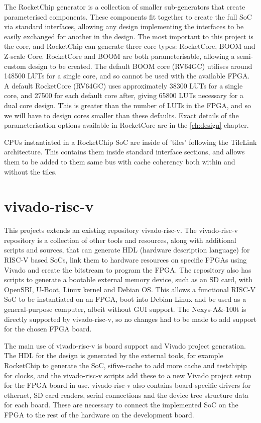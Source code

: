 The RocketChip generator is a collection of smaller sub-generators that create parameterised components. These components fit together to create the full SoC via standard interfaces, allowing any design implementing the interfaces to be easily exchanged for another in the design. The most important to this project is the core, and RocketChip can generate three core types: RocketCore, BOOM and Z-scale Core. RocketCore and BOOM are both parameterisable, allowing a semi-custom design to be created. The default BOOM core (RV64GC) utilises around 148500 LUTs for a single core, and so cannot be used with the available FPGA. A default RocketCore (RV64GC) uses approximately 38300 LUTs for a single core, and 27500 for each default core after, giving 65800 LUTs necessary for a dual core design. This is greater than the number of LUTs in the FPGA, and so we will have to design cores smaller than these defaults. Exact details of the parameterisation options available in RocketCore are in the \ref{ch:design} chapter.

CPUs instantiated in a RocketChip SoC are inside of 'tiles' following the TileLink architecture. This contains them inside standard interface sections, and allows them to be added to them same bus with cache coherency both within and without the tiles.

\section{vivado-risc-v}
\label{vivado-risc-v}
This projects extends an existing repository vivado-risc-v\cite{vivado-risc-v}. The vivado-risc-v repository is a collection of other tools and resources, along with additional scripts and sources, that can generate HDL (hardware description language) for RISC-V based SoCs, link them to hardware resources on specific FPGAs using Vivado and create the bitstream to program the FPGA. The repository also has scripts to generate a bootable external memory device, such as an SD card, with OpenSBI, U-Boot, Linux kernel and Debian OS. This allows a functional RISC-V SoC to be instantiated on an FPGA, boot into Debian Linux and be used as a general-purpose computer, albeit without GUI support. The Nexys-A&-100t is directly supported by vivado-risc-v, so no changes had to be made to add support for the chosen FPGA board.

The main use of vivado-risc-v is board support and Vivado project generation. The HDL for the design is generated by the external tools, for example RocketChip to generate the SoC, sifive-cache to add more cache and testchipip for clocks, and the vivado-risc-v scripts add these to a new Vivado project setup for the FPGA board in use. vivado-risc-v also contains board-specific drivers for ethernet, SD card readers, serial connections and the device tree structure data for each board. These are necessary to connect the implemented SoC on the FPGA to the rest of the hardware on the development board.

